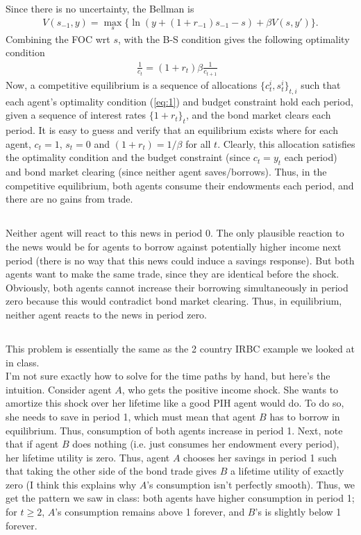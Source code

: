 \documentclass[12pt]{article}
\begin{document}
Since there is no uncertainty, the Bellman is 
\begin{align*}
V(s_{-1} , y) = \max_s \{ \ln(y+(1+r_{-1})s_{-1} - s) + \beta V(s,y')\}.
\end{align*}
Combining the FOC wrt $s$, with the B-S condition gives the following optimality condition
\begin{align}
\frac{1}{c_t} = (1+r_t)\beta \frac{1}{c_{t+1}} \text{ } \label{eq:1}
\end{align}
Now, a competitive equilibrium is a sequence of allocations $\{c^i_t, s^i_t\}_{t,i}$ such that each agent's optimality condition (\ref{eq:1}) and budget constraint hold each period, given a sequence of interest rates $\{1+r_t\}_t$, and the bond market clears each period. It is easy to guess and verify that an equilibrium exists where for each agent, $c_t = 1$, $s_t = 0$ and $(1+r_t) = 1/\beta$ for all $t$. Clearly, this allocation satisfies the optimality condition and the budget constraint (since $c_t = y_t$ each period) and bond market clearing (since neither agent saves/borrows). Thus, in the competitive equilibrium, both agents consume their endowments each period, and there are no gains from trade.

\subsection{}
Neither agent will react to this news in period 0. The only plausible reaction to the news would be for agents to borrow against potentially higher income next period (there is no way that this news could induce a savings response). But both agents want to make the same trade, since they are identical before the shock. Obviously, both agents cannot increase their borrowing simultaneously in period zero because this would contradict bond market clearing. Thus, in equilibrium, neither agent reacts to the news in period zero.

\subsection{}
This problem is essentially the same as the 2 country IRBC example we looked at in class.\\ 

I'm not sure exactly how to solve for the time paths by hand, but here's the intuition. Consider agent $A$, who gets the positive income shock. She wants to amortize this shock over her lifetime like a good PIH agent would do. To do so, she needs to save in period 1, which must mean that agent $B$ has to borrow in equilibrium. Thus, consumption of both agents increase in period 1. Next, note that if agent $B$ does nothing (i.e. just consumes her endowment every period), her lifetime utility is zero. Thus, agent $A$ chooses her savings in period 1 such that taking the other side of the bond trade gives $B$ a lifetime utility of exactly zero (I think this explains why $A$'s consumption isn't perfectly smooth). Thus, we get the pattern we saw in class: both agents have higher consumption in period 1; for $t\geq 2$, $A$'s consumption remains above 1 forever, and $B$'s is slightly below 1 forever. 
\end{document}
